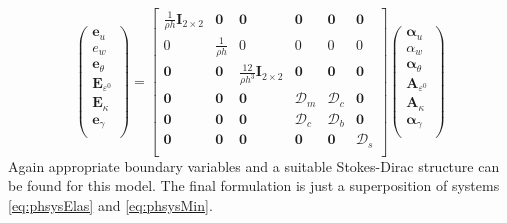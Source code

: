 \begin{equation}
\begin{pmatrix}
\bm{e}_u \\
e_w \\
\bm{e}_{\theta} \\
\bm{E}_{\varepsilon^0} \\
\bm{E}_{\kappa} \\
\bm{e}_{\gamma} \\
\end{pmatrix}
 = 
\begin{bmatrix}
\frac{1}{\rho h}\bm{I}_{2 \times 2} & \bm{0} & \bm{0} &  \bm{0} & \bm{0} & \bm{0} \\
0 & \frac{1}{\rho h} & 0 & 0  & 0 & 0 \\
\bm{0} & \bm{0} & \frac{12}{\rho h^3}\bm{I}_{2 \times 2} & \bm{0} & \bm{0} & \bm{0}\\
\bm{0} & \bm{0} & \bm{0} & \bm{\mathcal{D}}_m & \bm{\mathcal{D}}_c & \bm{0} \\
\bm{0} & \bm{0} & \bm{0} & \bm{\mathcal{D}}_c & \bm{\mathcal{D}}_b & \bm{0}\\
\bm{0} & \bm{0} & \bm{0} & \bm{0} & \bm{0} & \bm{\mathcal{D}}_s \\
\end{bmatrix}
\begin{pmatrix}
\bm\alpha_u \\
\alpha_w \\
\bm\alpha_\theta \\
\bm{A}_{\varepsilon^0} \\
\bm{A}_\kappa \\
\bm\alpha_{\gamma} \\
\end{pmatrix}
\end{equation}
Again appropriate boundary variables and a suitable Stokes-Dirac structure can be found for this model. The final formulation is just a superposition of systems \eqref{eq:phsysElas} and \eqref{eq:phsysMin}.

